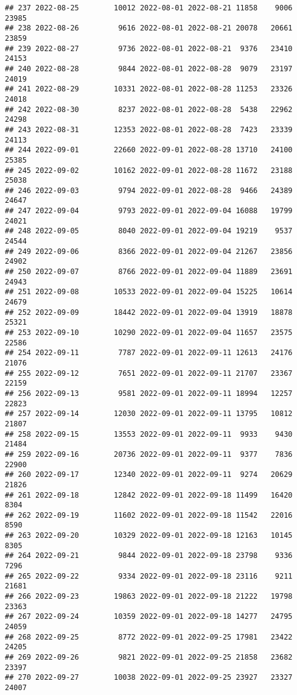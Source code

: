 \documentclass[
]{article}
\begin{document}
\begin{verbatim}
## 237 2022-08-25        10012 2022-08-01 2022-08-21 11858    9006      23985
## 238 2022-08-26         9616 2022-08-01 2022-08-21 20078   20661      23859
## 239 2022-08-27         9736 2022-08-01 2022-08-21  9376   23410      24153
## 240 2022-08-28         9844 2022-08-01 2022-08-28  9079   23197      24019
## 241 2022-08-29        10331 2022-08-01 2022-08-28 11253   23326      24018
## 242 2022-08-30         8237 2022-08-01 2022-08-28  5438   22962      24298
## 243 2022-08-31        12353 2022-08-01 2022-08-28  7423   23339      24113
## 244 2022-09-01        22660 2022-09-01 2022-08-28 13710   24100      25385
## 245 2022-09-02        10162 2022-09-01 2022-08-28 11672   23188      25038
## 246 2022-09-03         9794 2022-09-01 2022-08-28  9466   24389      24647
## 247 2022-09-04         9793 2022-09-01 2022-09-04 16088   19799      24021
## 248 2022-09-05         8040 2022-09-01 2022-09-04 19219    9537      24544
## 249 2022-09-06         8366 2022-09-01 2022-09-04 21267   23856      24902
## 250 2022-09-07         8766 2022-09-01 2022-09-04 11889   23691      24943
## 251 2022-09-08        10533 2022-09-01 2022-09-04 15225   10614      24679
## 252 2022-09-09        18442 2022-09-01 2022-09-04 13919   18878      25321
## 253 2022-09-10        10290 2022-09-01 2022-09-04 11657   23575      22586
## 254 2022-09-11         7787 2022-09-01 2022-09-11 12613   24176      21076
## 255 2022-09-12         7651 2022-09-01 2022-09-11 21707   23367      22159
## 256 2022-09-13         9581 2022-09-01 2022-09-11 18994   12257      22823
## 257 2022-09-14        12030 2022-09-01 2022-09-11 13795   10812      21807
## 258 2022-09-15        13553 2022-09-01 2022-09-11  9933    9430      21484
## 259 2022-09-16        20736 2022-09-01 2022-09-11  9377    7836      22900
## 260 2022-09-17        12340 2022-09-01 2022-09-11  9274   20629      21826
## 261 2022-09-18        12842 2022-09-01 2022-09-18 11499   16420       8304
## 262 2022-09-19        11602 2022-09-01 2022-09-18 11542   22016       8590
## 263 2022-09-20        10329 2022-09-01 2022-09-18 12163   10145       8305
## 264 2022-09-21         9844 2022-09-01 2022-09-18 23798    9336       7296
## 265 2022-09-22         9334 2022-09-01 2022-09-18 23116    9211      21681
## 266 2022-09-23        19863 2022-09-01 2022-09-18 21222   19798      23363
## 267 2022-09-24        10359 2022-09-01 2022-09-18 14277   24795      24059
## 268 2022-09-25         8772 2022-09-01 2022-09-25 17981   23422      24205
## 269 2022-09-26         9821 2022-09-01 2022-09-25 21858   23682      23397
## 270 2022-09-27        10038 2022-09-01 2022-09-25 23927   23327      24007

\end{verbatim}
\end{document}
